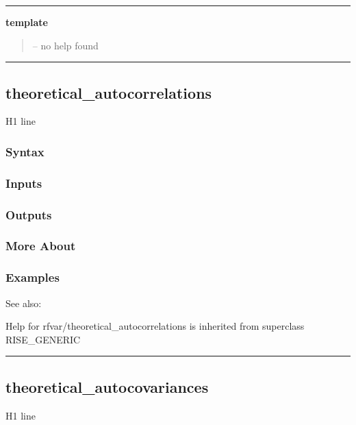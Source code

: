 \documentclass[letterpaper,10pt,english]{sphinxmanual}
\begin{document}
\bigskip\hrule{}\bigskip

\label{classes/models/@rfvar/rfvar:template}
\textbf{template}
\begin{quote}

-- no help found
\end{quote}


\bigskip\hrule{}\bigskip



\subsection{theoretical\_autocorrelations}
\label{classes/models/@rfvar/rfvar:theoretical-autocorrelations}\label{classes/models/@rfvar/rfvar:id144}
H1 line


\subsubsection{Syntax}
\label{classes/models/@rfvar/rfvar:id145}

\subsubsection{Inputs}
\label{classes/models/@rfvar/rfvar:id146}

\subsubsection{Outputs}
\label{classes/models/@rfvar/rfvar:id147}

\subsubsection{More About}
\label{classes/models/@rfvar/rfvar:id148}

\subsubsection{Examples}
\label{classes/models/@rfvar/rfvar:id149}
See also:

Help for rfvar/theoretical\_autocorrelations is inherited from superclass RISE\_GENERIC


\bigskip\hrule{}\bigskip



\subsection{theoretical\_autocovariances}
\label{classes/models/@rfvar/rfvar:theoretical-autocovariances}\label{classes/models/@rfvar/rfvar:id150}
H1 line
\end{document}
